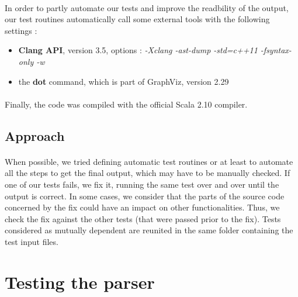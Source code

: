 \documentclass{report}
\begin{document}
\paragraph{}
\hspace{4mm}In order to partly automate our tests and improve the readbility of the output, our test routines automatically call some external tools with the following settings :

\vspace{1.5mm}
\begin{itemize}
\item \textbf{Clang API}, version 3.5, options : \textit{-Xclang -ast-dump -std=c++11 -fsyntax-only -w}\vspace{1mm}
\item the \textbf{dot} command, which is part of GraphViz, version 2.29\vspace{1mm}
\end{itemize}

\paragraph{}
\hspace{4mm}Finally, the code was compiled with the official Scala 2.10 compiler.

\subsection{Approach}

\paragraph{}
\hspace{4mm}When possible, we tried defining automatic test routines or at least to automate all the steps to get the final output, which may have to be manually checked.
If one of our tests fails, we fix it, running the same test over and over until the output is correct.
In some cases, we consider that the parts of the source code concerned by the fix could have an impact on other functionalities. Thus, we check the fix against the other
tests (that were passed prior to the fix). Tests considered as mutually dependent are reunited in the same folder containing the test input files.

\section{Testing the parser}
\end{document}
